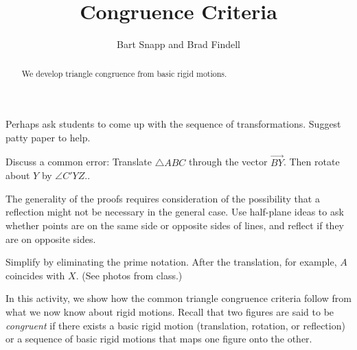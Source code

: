 \documentclass[instructornotes,nooutcomes]{ximera}
\title{Congruence Criteria}
\author{Bart Snapp and Brad Findell}
\begin{document}
\begin{abstract}
    We develop triangle congruence from basic rigid motions.  
\end{abstract}
\maketitle

\begin{teachingnote}
Perhaps ask students to come up with the sequence of transformations. Suggest patty paper to help.  

Discuss a common error:   Translate $\triangle ABC$ through the vector $\overrightarrow{BY}$.  Then rotate about $Y$ by $\angle C'YZ.$. 

The generality of the proofs requires consideration of the possibility that a reflection might not be necessary in the general case.  Use half-plane ideas to ask whether points are on the same side or opposite sides of lines, and reflect if they are on opposite sides.  

Simplify by eliminating the prime notation.  After the translation, for example, $A$ coincides with $X$.  (See photos from class.)
\end{teachingnote}

In this activity, we show how the common triangle congruence criteria follow from
 what we now know about rigid motions.  
 Recall that two figures are said to be 
\emph{congruent} if there exists a basic rigid motion (translation, rotation, or reflection) or a 
sequence of basic rigid motions that maps one figure onto the other.  
\end{document}

